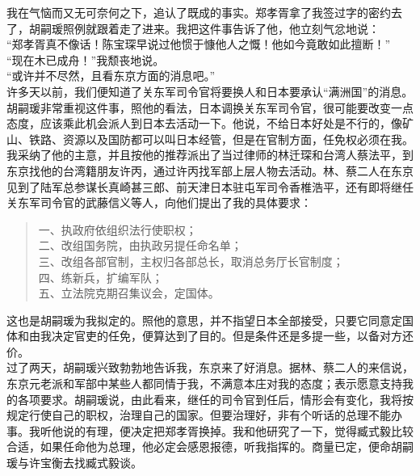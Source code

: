 我在气恼而又无可奈何之下，追认了既成的事实。郑孝胥拿了我签过字的密约去了，胡嗣瑗照例就跟着走了进来。我把这件事告诉了他，他立刻气忿地说：\\

“郑孝胥真不像话！陈宝琛早说过他惯于慷他人之慨！他如今竟敢如此擅断！”\\

“现在木已成舟！”我颓丧地说。\\

“或许并不尽然，且看东京方面的消息吧。”\\

许多天以前，我们便知道了关东军司令官将要换人和日本要承认“满洲国”的消息。胡嗣瑗非常重视这件事，照他的看法，日本调换关东军司令官，很可能要改变一点态度，应该乘此机会派人到日本去活动一下。他说，不给日本好处是不行的，像矿山、铁路、资源以及国防都可以叫日本经管，但是在官制方面，任免权必须在我。我采纳了他的主意，并且按他的推荐派出了当过律师的林迁琛和台湾人蔡法平，到东京找他的台湾籍朋友许丙，通过许丙找军部上层人物去活动。林、蔡二人在东京见到了陆军总参谋长真崎甚三郎、前天津日本驻屯军司令香椎浩平，还有即将继任关东军司令官的武藤信义等人，向他们提出了我的具体要求：\\

\begin{quote}
	一、执政府依组织法行使职权；\\

二、改组国务院，由执政另提任命名单；\\

三、改组各部官制，主权归各部总长，取消总务厅长官制度；\\

四、练新兵，扩编军队；\\

五、立法院克期召集议会，定国体。\\
\end{quote}

这也是胡嗣瑗为我拟定的。照他的意思，并不指望日本全部接受，只要它同意定国体和由我决定官吏的任免，便算达到了目的。但是条件还是多提一些，以备对方还价。\\

过了两天，胡嗣瑗兴致勃勃地告诉我，东京来了好消息。据林、蔡二人的来信说，东京元老派和军部中某些人都同情于我，不满意本庄对我的态度；表示愿意支持我的各项要求。胡嗣瑗说，由此看来，继任的司令官到任后，情形会有变化，我将按规定行使自己的职权，治理自己的国家。但要治理好，非有个听话的总理不能办事。我听他说的有理，便决定把郑孝胥换掉。我和他研究了一下，觉得臧式毅比较合适，如果任命他为总理，他必定会感恩报德，听我指挥的。商量已定，便命胡嗣瑗与许宝衡去找臧式毅谈。\\

